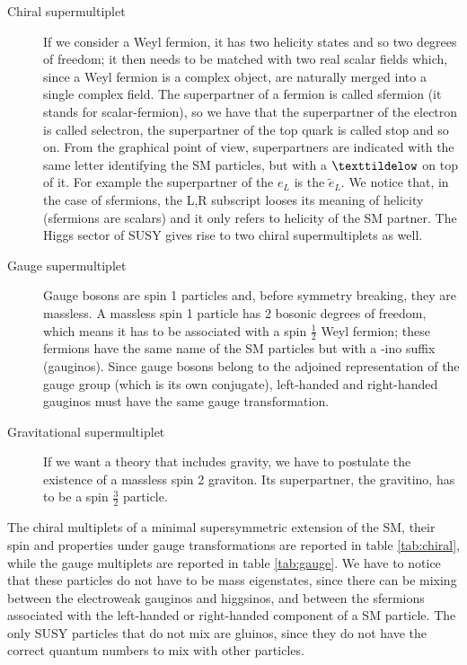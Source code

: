 \begin{description}

\item[Chiral supermultiplet] If we consider a Weyl fermion, it has two helicity states and so two degrees of freedom; it then needs to be matched with two real scalar fields which, since a Weyl fermion is a complex object, are naturally merged into a single complex field. The superpartner of a fermion is called sfermion (it stands for scalar-fermion), so we have that the superpartner of the electron is called selectron, the superpartner of the top quark is called stop and so on. From the graphical point of view, superpartners are indicated with the same letter identifying the SM particles, but with a $\texttildelow$ on top of it. For example the superpartner of the $e_L$ is the $\tilde{e}_L$. We notice that, in the case of sfermions, the L,R subscript looses its meaning of helicity (sfermions are scalars) and it only refers to helicity of the SM partner. The Higgs sector of SUSY gives rise to two chiral supermultiplets as well.

\item[Gauge supermultiplet] Gauge bosons are spin 1 particles and, before symmetry breaking, they are massless. A massless spin 1 particle has 2 bosonic degrees of freedom, which means it has to be associated with a spin $\frac{1}{2}$ Weyl fermion; these fermions have the same name of the SM particles but with a -ino suffix (gauginos). Since gauge bosons belong to the adjoined representation of the gauge group (which is its own conjugate), left-handed and right-handed gauginos must have the same gauge transformation. 

\item[Gravitational supermultiplet] If we want a theory that includes gravity, we have to postulate the existence of a massless spin 2 graviton. Its superpartner, the gravitino, has to be a spin $\frac{3}{2}$ particle.

\end{description}

The chiral multiplets of a minimal supersymmetric extension of the SM, their spin and properties under gauge transformations are reported in table \ref{tab:chiral}, while the gauge multiplets are reported in table \ref{tab:gauge}. We have to notice that these particles do not have to be mass eigenstates, since there can be mixing between the electroweak gauginos and higgsinos, and between the sfermions associated with the left-handed or right-handed component of a SM particle. The only SUSY particles that do not mix are gluinos, since they do not have the correct quantum numbers to mix with other particles.

